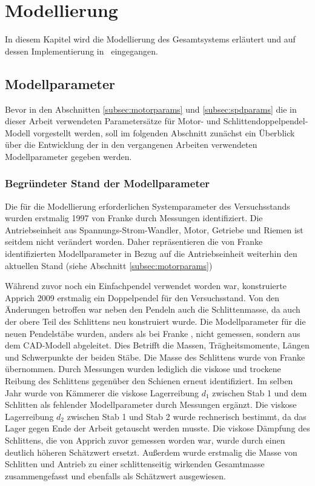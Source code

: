 \chapter{Modellierung}\label{cha:modell}

In diesem Kapitel wird die Modellierung des Gesamtsystems erläutert und auf dessen Implementierung in \Simulink\ eingegangen.





\section{Modellparameter}\label{sec:mparams}

Bevor in den Abschnitten \ref{subsec:motorparams} und \ref{subsec:spdparams} die in dieser Arbeit verwendeten Parametersätze für Motor- und Schlittendoppelpendel-Modell vorgestellt werden, soll im folgenden Abschnitt zunächst ein Überblick über die Entwicklung der in den vergangenen Arbeiten verwendeten Modellparameter gegeben werden.  

\subsection{Begründeter Stand der Modellparameter}\label{subsec:paramshist}

Die für die Modellierung erforderlichen Systemparameter des Versuchsstands wurden erstmalig 1997 von Franke \cite{franke} durch Messungen identifiziert. Die Antriebseinheit aus Spannungs-Strom-Wandler, Motor, Getriebe und Riemen ist seitdem nicht verändert worden. Daher repräsentieren die von Franke \cite{franke} identifizierten Modellparameter in Bezug auf die Antriebseinheit weiterhin den aktuellen Stand (siehe Abschnitt \ref{subsec:motorparams})
   
Während zuvor noch ein Einfachpendel verwendet worden war, konstruierte Apprich \cite{apprich} 2009 erstmalig ein Doppelpendel für den Versuchsstand. Von den Änderungen betroffen war neben den Pendeln auch die Schlittenmasse, da auch der obere Teil des Schlittens neu konstruiert wurde. Die Modellparameter für die neuen Pendelstäbe wurden, anders als bei Franke \cite{franke}, nicht gemessen, sondern aus dem CAD-Modell abgeleitet. Dies Betrifft die Massen, Trägheitsmomente, Längen und Schwerpunkte der beiden Stäbe. Die Masse des Schlittens wurde von Franke \cite{franke} übernommen. Durch Messungen wurden lediglich die viskose und trockene Reibung des Schlittens gegenüber den Schienen erneut identifiziert. Im selben Jahr wurde von Kämmerer \cite{kämmerer} die viskose Lagerreibung $d_1$ zwischen Stab 1 und dem Schlitten als fehlender Modellparameter durch Messungen ergänzt. Die viskose Lagerreibung $d_2$ zwischen Stab 1 und Stab 2 wurde rechnerisch bestimmt, da das Lager gegen Ende der Arbeit getauscht werden musste. Die viskose Dämpfung des Schlittens, die von Apprich \cite{apprich} zuvor gemessen worden war, wurde durch einen deutlich höheren Schätzwert ersetzt. Außerdem wurde erstmalig die Masse von Schlitten und Antrieb zu einer schlittenseitig wirkenden Gesamtmasse zusammengefasst und ebenfalls als Schätzwert ausgewiesen.

